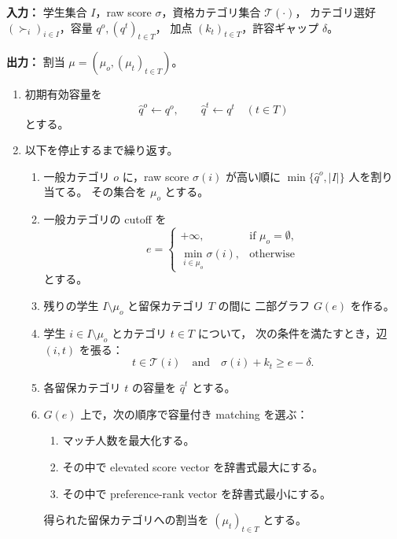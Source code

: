\documentclass[
  12pt,
  a4paper,
  oneside,
  onecolumn,
  titlepage,
  final
]{jsarticle}
\newcommand{\1}{\mathbf{1}}
\begin{document}
\begin{algorithm}[H]
\caption{\textsc{Preference-Aware Overlapping De-Reservation}（PA-ODR）}
\label{alg:pa-odr}
\small

\textbf{入力：}
学生集合 $I$，raw score $\sigma$，資格カテゴリ集合 $\mathcal T(\cdot)$，
カテゴリ選好 $(\succ_i)_{i\in I}$，容量 $q^o,(q^t)_{t\in T}$，
加点 $(k_t)_{t\in T}$，許容ギャップ $\delta$。

\textbf{出力：}
割当 $\mu=(\mu_o,(\mu_t)_{t\in T})$。

\begin{enumerate}
    \item 初期有効容量を
    \[
        \hat q^o \leftarrow q^o,
        \qquad
        \hat q^t \leftarrow q^t \quad (t\in T)
    \]
    とする。

    \item 以下を停止するまで繰り返す。

    \begin{enumerate}
        \item 一般カテゴリ $o$ に，raw score $\sigma(i)$ が高い順に
        $\min\{\hat q^o,|I|\}$ 人を割り当てる。
        その集合を $\mu_o$ とする。

        \item 一般カテゴリの cutoff を
        \[
            e=
            \begin{cases}
            +\infty, & \text{if } \mu_o=\emptyset,\\
            \min_{i\in\mu_o}\sigma(i), & \text{otherwise}
            \end{cases}
        \]
        とする。

        \item 残りの学生 $I\setminus\mu_o$ と留保カテゴリ $T$ の間に
        二部グラフ $G(e)$ を作る。

        \item 学生 $i\in I\setminus\mu_o$ とカテゴリ $t\in T$ について，
        次の条件を満たすとき，辺 $(i,t)$ を張る：
        \[
            t\in\mathcal T(i)
            \quad\text{and}\quad
            \sigma(i)+k_t\ge e-\delta.
        \]

        \item 各留保カテゴリ $t$ の容量を $\hat q^t$ とする。

        \item $G(e)$ 上で，次の順序で容量付き matching を選ぶ：
        \begin{enumerate}
            \item マッチ人数を最大化する。
            \item その中で elevated score vector を辞書式最大にする。
            \item その中で preference-rank vector を辞書式最小にする。
        \end{enumerate}
        得られた留保カテゴリへの割当を $(\mu_t)_{t\in T}$ とする。


\end{enumerate}
\end{enumerate}
\end{algorithm}
\end{document}
